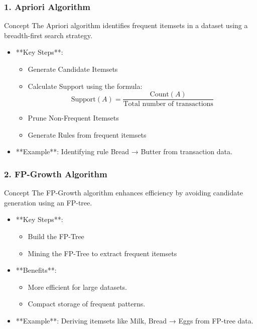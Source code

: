 \documentclass{beamer}
\begin{document}
\begin{frame}[fragile]
    \frametitle{1. Apriori Algorithm}
    \begin{block}{Concept}
        The Apriori algorithm identifies frequent itemsets in a dataset using a breadth-first search strategy.
    \end{block}
    \begin{itemize}
        \item **Key Steps**:
        \begin{itemize}
            \item Generate Candidate Itemsets
            \item Calculate Support using the formula:
            \begin{equation}
                \text{Support}(A) = \frac{\text{Count}(A)}{\text{Total number of transactions}}
            \end{equation}
            \item Prune Non-Frequent Itemsets
            \item Generate Rules from frequent itemsets
        \end{itemize}
        \item **Example**: Identifying rule {Bread} → {Butter} from transaction data.
    \end{itemize}
\end{frame}

\begin{frame}[fragile]
    \frametitle{2. FP-Growth Algorithm}
    \begin{block}{Concept}
        The FP-Growth algorithm enhances efficiency by avoiding candidate generation using an FP-tree.
    \end{block}
    \begin{itemize}
        \item **Key Steps**:
        \begin{itemize}
            \item Build the FP-Tree
            \item Mining the FP-Tree to extract frequent itemsets
        \end{itemize}
        \item **Benefits**:
        \begin{itemize}
            \item More efficient for large datasets.
            \item Compact storage of frequent patterns.
        \end{itemize}
        \item **Example**: Deriving itemsets like {Milk, Bread} → {Eggs} from FP-tree data.
    \end{itemize}
\end{frame}
\end{document}
